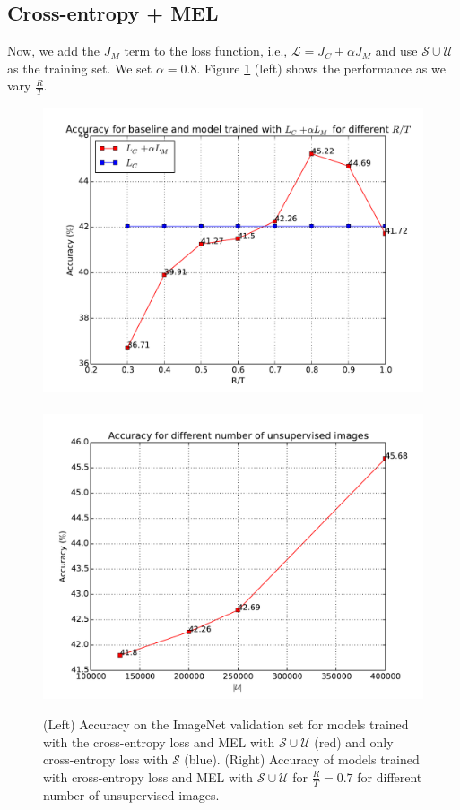 \documentclass[runningheads]{llncs}
\begin{document}
\subsection{Cross-entropy + MEL}
Now, we add the $J_M$ term to the loss function, i.e., $\mathcal{L} = J_C + \alpha
J_M$ and use $\mathcal{S} \cup \mathcal{U}$ as the training set. We set $\alpha = 0.8$. Figure
\ref{fig:acc} (left) shows the performance as we vary $\frac{R}{T}$.

\begin{figure}
	\centering
	{
		\includegraphics[scale=0.35]{accuracies.pdf}
	~
		\includegraphics[scale=0.35]{accuracies_unsup.pdf}
	}
		\caption{(Left) Accuracy on the ImageNet validation set for models trained with the cross-entropy
		loss and MEL with $\mathcal{S}\cup\mathcal{U}$ (red) and only cross-entropy loss with
	$\mathcal{S}$ (blue). (Right) Accuracy of models trained with cross-entropy loss and MEL with
$\mathcal{S}\cup\mathcal{U}$ for $\frac{R}{T} = 0.7$ for different number of unsupervised images.}
		\label{fig:acc}
\end{figure}
\end{document}

